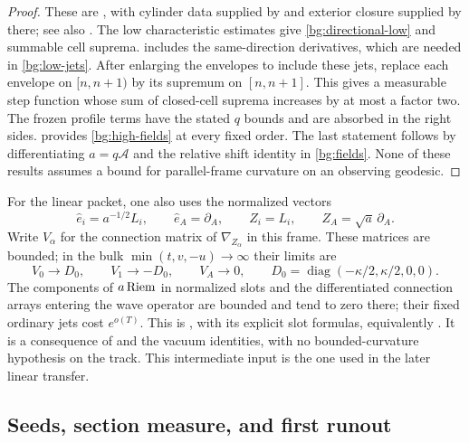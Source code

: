 \begin{proof}
These are \cite[, , ]{KerrCTwo}, with cylinder
data supplied by  and exterior closure supplied
by  there; see also
\cite[]{KerrCOne}. The low characteristic estimates
give \eqref{bg:directional-low} and summable cell suprema.
 includes the same-direction derivatives, which
are needed in \eqref{bg:low-jets}. After enlarging the envelopes to
include these jets, replace each envelope on $[n,n+1)$ by its
supremum on $[n,n+1]$. This gives a measurable step function whose
sum of closed-cell suprema increases by at most a factor two.
The frozen profile terms have
the stated $q$ bounds and are absorbed in the right sides.
 provides \eqref{bg:high-fields} at every fixed
order. The last statement follows by differentiating
$a=q\mathcal A$ and the relative shift identity in
\eqref{bg:fields}. None of these results assumes a bound for
parallel-frame curvature on an observing geodesic.
\end{proof}

For the linear packet, one also uses the normalized vectors
\[
 \widehat e_i=a^{-1/2}L_i,\qquad \widehat e_A=\partial_A,
 \qquad Z_i=L_i,\qquad Z_A=\sqrt a\,\partial_A.
\]
Write $V_\alpha$ for the connection matrix of $\nabla_{Z_\alpha}$
in this frame. These matrices are bounded;
in the bulk $\min(t,v,-u)\to\infty$ their limits are
\begin{equation}\label{bg:normalized-limits}
 V_0\to D_0,\qquad V_1\to-D_0,\qquad V_A\to0,
 \qquad D_0=\operatorname{diag}(-\kappa/2,\kappa/2,0,0).
\end{equation}
The components of $a\operatorname{Riem}$ in normalized slots and the
differentiated connection arrays entering the wave operator are
bounded and tend to zero there; their fixed ordinary jets cost
$e^{o(T)}$. This is
\cite[]{KerrCOne}, with its explicit slot formulas,
equivalently \cite[]{KerrCTwo}. It is a consequence of
 and the vacuum identities, with no
bounded-curvature hypothesis on the track. This intermediate
input is the one used in the later linear transfer.

\subsection{Seeds, section measure, and first runout}

